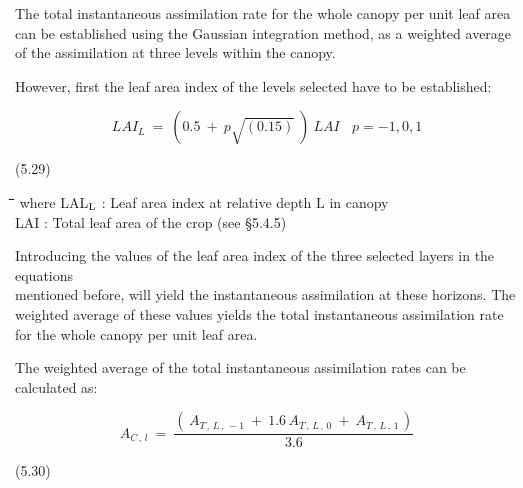 \documentclass[11pt]{article}
\begin{document}
\bigskip
\bigskip
The total instantaneous assimilation rate for the whole canopy per unit leaf area can be
established using the Gaussian integration method, as a weighted average of the assimila\-tion at three levels within the canopy.

\bigskip
\bigskip
However, first the leaf area index of the levels selected have to be established:

\begin{displaymath}
LAI _{L} ~=~ (0.5~+~p \sqrt{(0.15)} ~)~LAI~~~~p=-1,0,1
\end{displaymath}

 \bigskip
\strut\hfill (5.29)
\nwln
\begin{tabbing}
\hspace{1.27cm}\=\hspace{1.27cm}\=\hspace{1.27cm}\=\hspace{1.27cm}\=%
\hspace{1.27cm}\=\hspace{1.27cm}\=\hspace{1.27cm}\=\hspace{1.27cm}\=%
\hspace{1.27cm}\=\hspace{1.27cm}\=\kill
where\> LAL$_{{\rm L}}$\> : Leaf area index at relative depth L in canopy\> \> \> \> \> \> \> \> [ha ha$^{{\rm -1}}$]\\
\>LAI\> : Total leaf area of the crop\> \> \> \> (see \S 5.4.5)\> \> \> \> [ha ha$^{{\rm -1}}$]
\end{tabbing}

\bigskip
\bigskip
Introducing the values of the leaf area index of the three selected layers in the equations\\
mentioned before, will yield the instantaneous assimilation at these horizons. The
weighted average of these values yields the total instantaneous assimilation rate for the
whole canopy per unit leaf area.

\bigskip
\bigskip
\bigskip
\bigskip
\bigskip
 The weighted average of the total instanta\-neous assimilation rates can be calculated as:

\begin{displaymath}
A _{C\, ,\, l} ~=~{\frac{(\, A _{T\, ,\, L\, ,\, -1} ~+~1.6\, A _{T\, ,\, L\, ,\, 0} ~+~A _{T\, ,\, L\, ,\, 1\, } )}{3.6}}
\end{displaymath}

 \bigskip
\strut\hfill (5.30)
\end{document}
